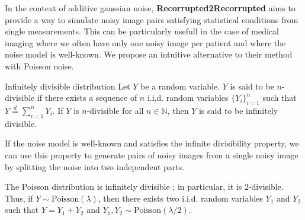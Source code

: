 In the context of additive gaussian noise, \textbf{Recorrupted2Recorrupted} \cite{Pang2021} aims to provide a way to simulate noisy image pairs satisfying statistical conditions from single measurements.
This can be particularly usefull in the case of medical imaging where we often have only one noisy image per patient and where the noise model is well-known.
We propose an intuitive alternative to their method with Poisson noise.

\begin{definition}{Infinitely divisible distribution}
    Let $Y$ be a random variable. $Y$ is said to be $n$-divisible if there exists a sequence of $n$ i.i.d. random variables $\{Y_i\}_{i=1}^n$ such that $Y \stackrel{d}{=} \sum_{i=1}^n Y_i$. If $Y$ is $n$-divisible for all $n \in \mathbb{N}$, then $Y$ is said to be infinitely divisible.
\end{definition}

If the noise model is well-known and satisfies the infinite divisibility property, we can use this property to generate pairs of noisy images from a single noisy image by splitting the noise into two independent parts.

\begin{proposition}
    The Poisson distribution is infinitely divisible ; in particular, it is $2$-divisible. Thus, if $Y \sim \text{Poisson}(\lambda)$, then there exists two i.i.d. random variables $Y_1$ and $Y_2$ such that $Y = Y_1 + Y_2$ and $Y_1, Y_2 \sim \text{Poisson}(\lambda/2)$.
    \label{prop:poisson_divisibility}
\end{proposition}

